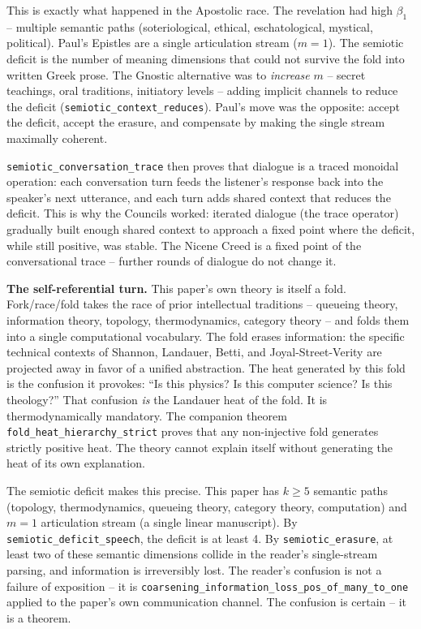 \documentclass[
  11pt,
]{article}
\begin{document}
This is exactly what happened in the Apostolic race. The revelation had
high \(\beta_1\) -- multiple semantic paths (soteriological, ethical,
eschatological, mystical, political). Paul's Epistles are a single
articulation stream (\(m = 1\)). The semiotic deficit is the number of
meaning dimensions that could not survive the fold into written Greek
prose. The Gnostic alternative was to \emph{increase} \(m\) -- secret
teachings, oral traditions, initiatory levels -- adding implicit
channels to reduce the deficit (\texttt{semiotic\_context\_reduces}).
Paul's move was the opposite: accept the deficit, accept the erasure,
and compensate by making the single stream maximally coherent.

\texttt{semiotic\_conversation\_trace} then proves that dialogue is a
traced monoidal operation: each conversation turn feeds the listener's
response back into the speaker's next utterance, and each turn adds
shared context that reduces the deficit. This is why the Councils
worked: iterated dialogue (the trace operator) gradually built enough
shared context to approach a fixed point where the deficit, while still
positive, was stable. The Nicene Creed is a fixed point of the
conversational trace -- further rounds of dialogue do not change it.

\textbf{The self-referential turn.} This paper's own theory is itself a
fold. Fork/race/fold takes the race of prior intellectual traditions --
queueing theory, information theory, topology, thermodynamics, category
theory -- and folds them into a single computational vocabulary. The
fold erases information: the specific technical contexts of Shannon,
Landauer, Betti, and Joyal-Street-Verity are projected away in favor of
a unified abstraction. The heat generated by this fold is the confusion
it provokes: ``Is this physics? Is this computer science? Is this
theology?'' That confusion \emph{is} the Landauer heat of the fold. It
is thermodynamically mandatory. The companion theorem
\texttt{fold\_heat\_hierarchy\_strict} proves that any non-injective
fold generates strictly positive heat. The theory cannot explain itself
without generating the heat of its own explanation.

The semiotic deficit makes this precise. This paper has \(k \geq 5\)
semantic paths (topology, thermodynamics, queueing theory, category
theory, computation) and \(m = 1\) articulation stream (a single linear
manuscript). By \texttt{semiotic\_deficit\_speech}, the deficit is at
least 4. By \texttt{semiotic\_erasure}, at least two of these semantic
dimensions collide in the reader's single-stream parsing, and
information is irreversibly lost. The reader's confusion is not a
failure of exposition -- it is
\texttt{coarsening\_information\_loss\_pos\_of\_many\_to\_one} applied
to the paper's own communication channel. The confusion is certain -- it
is a theorem.
\end{document}
